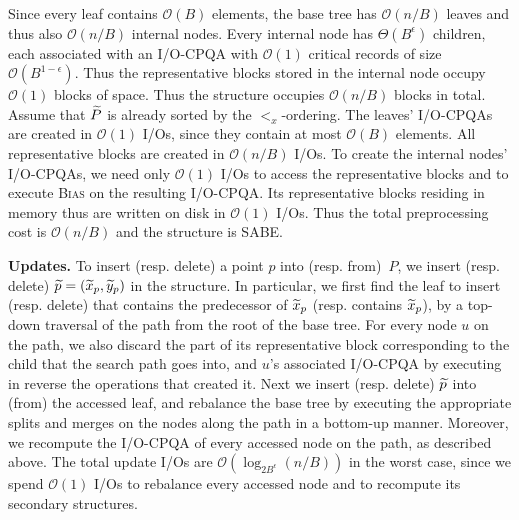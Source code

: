 \documentclass{sig-alternate}
\def\extraspacing{\vspace{2mm} \noindent}
\newcommand{\bigO}{\mathcal{O}}
\renewcommand{\(}{\left(}
\renewcommand{\)}{\right)}
\begin{document}
Since every leaf contains $\bigO(B)$ elements, the base tree has $\bigO(n/B)$
leaves and thus also $\bigO(n/B)$ internal nodes. Every internal node has
$\Theta(B^\epsilon)$ children, each associated with an I/O-CPQA with $\bigO(1)$
critical records of size $\bigO(B^{1-\epsilon})$. Thus the representative blocks
stored in the internal node occupy $\bigO(1)$ blocks of space. Thus the
structure occupies $\bigO(n/B)$ blocks in total. Assume that $\widetilde{P}$ is
already sorted by the $<_x$-ordering. The leaves' I/O-CPQAs  are created in
$\bigO(1)$ I/Os, since they contain at most $\bigO(B)$ elements. All
representative blocks are created in $\bigO(n/B)$ I/Os. To create the internal
nodes' I/O-CPQAs, we need only $\bigO(1)$ I/Os to access the representative
blocks and to execute \textsc{Bias} on the resulting I/O-CPQA. Its
representative blocks residing in memory thus are written on disk in $\bigO(1)$
I/Os. Thus the total preprocessing cost is $\bigO(n/B)$ and the structure is
SABE.

\extraspacing\textbf{Updates.} To insert (resp. delete) a point $p$ into (resp.
from)~$P$, we insert (resp. delete) $\widetilde{p} = (\widetilde{x}_p, \widetilde{y}_p)$ in the
structure. In particular, we first find the leaf to insert (resp. delete) that
contains the predecessor of $\widetilde{x}_p$ (resp. contains $\widetilde{x}_p$), by a
top-down traversal of the path from the root of the base tree. For every node
$u$ on the path, we also discard the part of its representative block
corresponding to the child that the search path goes into, and $u$'s associated
I/O-CPQA by executing in reverse the operations that created it. Next we insert
(resp. delete) $\widetilde{p}$ into (from) the accessed leaf, and rebalance the base
tree by executing the appropriate splits and merges on the nodes along the path
in a bottom-up manner. Moreover, we recompute the I/O-CPQA of every accessed
node on the path, as described above. The total update I/Os are
$\bigO(\log_{2B^\epsilon} (n/B))$ in the worst case, since we spend $\bigO(1)$
I/Os to rebalance every accessed node and to recompute its secondary structures.
\end{document}
